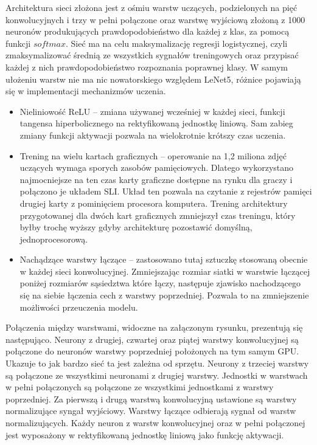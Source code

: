\documentclass[12pt,a4paper,twoside,titlepage,openright]{book}
\begin{document}
 Architektura sieci złożona jest z ośmiu warstw uczących, podzielonych na pięć konwolucyjnych i trzy w pełni połączone oraz warstwę wyjściową złożoną z 1000 neuronów produkujących prawdopodobieństwo dla każdej z klas, za pomocą funkcji $softmax$. Sieć ma na celu maksymalizację regresji logistycznej, czyli zmaksymalizować średnią ze wszystkich sygnałów treningowych oraz przypisać każdej z nich prawdopodobieństwo rozpoznania poprawnej klasy.
  W samym ułożeniu warstw nie ma nic nowatorskiego względem LeNet5, różnice pojawiają się w implementacji mechanizmów uczenia.
 \begin{itemize}
 \item Nieliniowość ReLU -- zmiana używanej wcześniej w każdej sieci, funkcji tangensa hiperbolicznego na rektyfikowaną jednostkę liniową. Sam zabieg zmiany funkcji aktywacji pozwala na wielokrotnie krótszy czas uczenia.
 \item Trening na wielu kartach graficznych -- operowanie na 1,2 miliona zdjęć uczących wymaga sporych zasobów pamięciowych. Dlatego wykorzystano najmocniejsze na ten czas karty graficzne dostępne na rynku dla graczy i połączono je układem SLI. Układ ten pozwala na czytanie z rejestrów pamięci drugiej karty z pominięciem procesora komputera. Trening architektury przygotowanej dla dwóch kart graficznych zmniejszył czas treningu, który byłby trochę wyższy gdyby architekturę pozostawić domyślną, jednoprocesorową.
 \item Nachądzące warstwy łączące -- zastosowano tutaj sztuczkę stosowaną obecnie w każdej sieci konwolucyjnej. Zmniejszając rozmiar siatki w warstwie łączącej poniżej rozmiarów sąsiedztwa które łączy, następuje zjawisko nachodzącego się na siebie łączenia cech z warstwy poprzedniej. Pozwala to na zmniejszenie możliwości przeuczenia modelu.
 \end{itemize}
 
 Połączenia między warstwami, widoczne na załączonym rysunku, prezentują się następująco. Neurony z drugiej, czwartej oraz piątej warstwy konwolucyjnej są połączone do neuronów warstwy poprzedniej położonych na tym samym GPU. Ukazuje to jak bardzo sieć ta jest zależna od sprzętu. Neurony z trzeciej warstwy są połączone ze wszystkimi neuronami z drugiej warstwy. Jednostki w warstwach w pełni połączonych są połączone ze wszystkimi jednostkami z warstwy poprzedniej. Za pierwszą i drugą warstwą konwolucyjną ustawione są warstwy normalizujące syngał wyjściowy. Warstwy łączące odbierają sygnał od warstw normalizujących. Każdy neuron z warstw konwolucyjnej oraz w pełni połączonej jest wyposażony w rektyfikowaną jednostkę liniową jako funkcję aktywacji.
\end{document}
